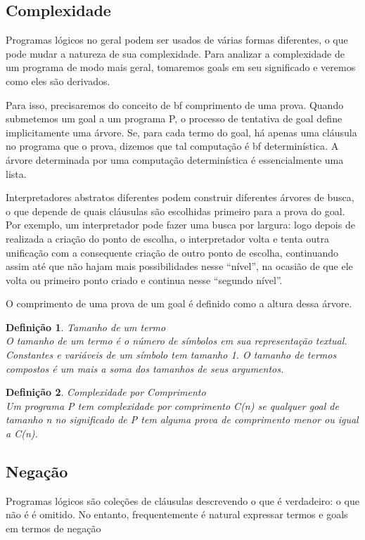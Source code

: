 \documentclass{article}
\newtheorem{definition}{Definição}[section]
\theoremstyle{remark}
\begin{document}
\subsection{Complexidade}

Programas lógicos no geral podem ser usados de várias formas diferentes, o que pode mudar a natureza de sua complexidade. Para analizar a complexidade de um programa de modo mais geral, tomaremos goals em seu significado e veremos como eles são derivados.

Para isso, precisaremos do conceito de {bf comprimento de uma prova}. Quando submetemos um goal a um programa P, o processo de tentativa de goal define implicitamente uma árvore. Se, para cada termo do goal, há apenas uma cláusula no programa que o prova, dizemos que tal computação é {bf determinística}. A árvore determinada por uma computação determinística é essencialmente uma lista.

Interpretadores abstratos diferentes podem construir diferentes árvores de busca, o que depende de quais cláusulas são escolhidas primeiro para a prova do goal. Por exemplo, um interpretador pode fazer uma busca por largura: logo depois de realizada a criação do ponto de escolha, o interpretador volta e tenta outra unificação com a consequente criação de outro ponto de escolha, continuando assim até que não hajam mais possibilidades nesse ``nível'', na ocasião de que ele
volta ou primeiro ponto criado e continua nesse ``segundo nível''.

O comprimento de uma prova de um goal é definido como a altura dessa árvore.

\begin{definition}{Tamanho de um termo}
  \\ O tamanho de um termo é o número de símbolos em sua representação textual. Constantes e variáveis de um símbolo tem tamanho 1. O tamanho de termos compostos é um mais a soma dos tamanhos de seus argumentos.
\end{definition}

\begin{definition}{Complexidade por Comprimento}
  \\ Um programa P tem complexidade por comprimento C(n) se qualquer goal de tamanho n no significado de P tem alguma prova de comprimento menor ou igual a C(n).
\end{definition}

\subsection{Negação}

Programas lógicos são coleções de cláusulas descrevendo o que é verdadeiro: o que não é é omitido. No entanto, frequentemente é natural expressar termos e goals em termos de negação
\end{document}
